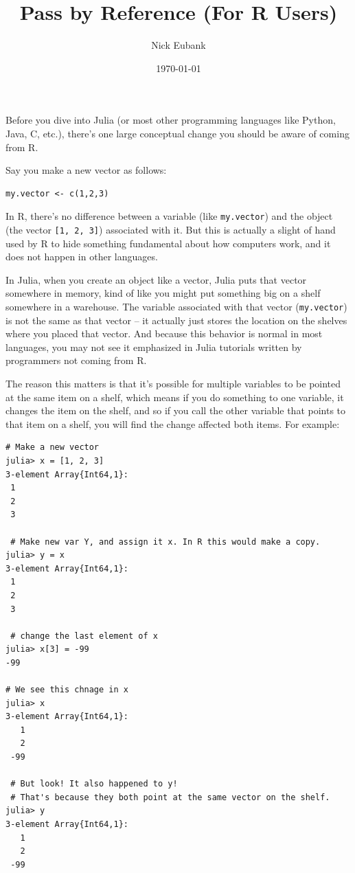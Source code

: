 \documentclass[12pt]{article}
\title{Pass by Reference (For R Users)}
\author{Nick Eubank}
\date{\today}
\begin{document}
\maketitle


Before you dive into Julia (or most other programming languages like Python, Java, C, etc.), there’s one large conceptual change you should be aware of coming from R.

Say you make a new vector as follows:

\begin{verbatim}
my.vector <- c(1,2,3)
\end{verbatim}

In R, there’s no difference between a variable (like \texttt{my.vector}) and the object (the vector \texttt{[1, 2, 3]}) associated with it. But this is actually a slight of hand used by R to hide something fundamental about how computers work, and it does not happen in other languages.

In Julia, when you create an object like a vector, Julia puts that vector somewhere in memory, kind of like you might put something big on a shelf somewhere in a warehouse. The variable associated with that vector (\texttt{my.vector}) is not the same as that vector – it actually just stores the location on the shelves where you placed that vector. And because this behavior is normal in most languages, you may not see it emphasized in Julia tutorials written by programmers not coming from R.

The reason this matters is that it’s possible for multiple variables to be pointed at the same item on a shelf, which means if you do something to one variable, it changes the item on the shelf, and so if you call the other variable that points to that item on a shelf, you will find the change affected both items. For example:

\begin{verbatim}
# Make a new vector
julia> x = [1, 2, 3]
3-element Array{Int64,1}:
 1
 2
 3

 # Make new var Y, and assign it x. In R this would make a copy.
julia> y = x
3-element Array{Int64,1}:
 1
 2
 3

 # change the last element of x
julia> x[3] = -99
-99

# We see this chnage in x
julia> x
3-element Array{Int64,1}:
   1
   2
 -99

 # But look! It also happened to y!
 # That's because they both point at the same vector on the shelf.
julia> y
3-element Array{Int64,1}:
   1
   2
 -99

\end{verbatim}
\end{document}
